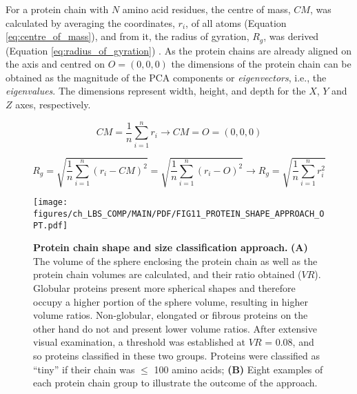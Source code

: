 For a protein chain with $N$ amino acid residues, the centre of mass, $CM$, was calculated by averaging the coordinates, $r_{i}$, of all atoms (Equation \ref{eq:centre_of_mass}), and from it, the radius of gyration, $R_{g}$, was derived (Equation \ref{eq:radius_of_gyration}) \cite{FIXMAN_1962_ROG}. As the protein chains are already aligned on the axis and centred on $O = (0, 0, 0)$ the dimensions of the protein chain can be obtained as the magnitude of the PCA components or \textit{eigenvectors}, i.e., the \textit{eigenvalues}. The dimensions represent width, height, and depth for the $X$, $Y$ and $Z$ axes, respectively.

\begin{equation}
CM = \frac{1}{n} \sum_{i=1}^{n} r_i \rightarrow CM = O = (0,0,0)
\label{eq:centre_of_mass}
\end{equation}

\begin{equation}
R_g = \sqrt{\frac{1}{n} \sum_{i=1}^{n} (r_i - CM)^2} = \sqrt{\frac{1}{n} \sum_{i=1}^{n} (r_i - O)^2} \rightarrow R_g = \sqrt{\frac{1}{n} \sum_{i=1}^{n} r_i^2}
\label{eq:radius_of_gyration}
\end{equation}

\begin{figure}[htb!]
    \centering
    \texttt{[image: figures/ch\_LBS\_COMP/MAIN/PDF/FIG11\_PROTEIN\_SHAPE\_APPROACH\_OPT.pdf]}
    \caption[Protein chain shape and size classification approach]{\textbf{Protein chain shape and size classification approach.} \textbf{(A)} The volume of the sphere enclosing the protein chain as well as the protein chain volumes are calculated, and their ratio obtained ($VR$). Globular proteins present more spherical shapes and therefore occupy a higher portion of the sphere volume, resulting in higher volume ratios. Non-globular, elongated or fibrous proteins on the other hand do not and present lower volume ratios. After extensive visual examination, a threshold was established at $VR$ = 0.08, and so proteins classified in these two groups. Proteins were classified as ``tiny'' if their chain was $\leq$ 100 amino acids; \textbf{(B)} Eight examples of each protein chain group to illustrate the outcome of the approach.}
    \label{fig:protein_class_approach}
\end{figure}

